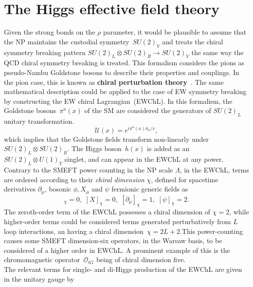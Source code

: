 \section{The Higgs effective field theory\label{sec:chiral}}
Given the strong bonds on the $\rho$ parameter, it would be plausible to assume that the NP maintains the custodial symmetry~$SU(2)_V$ and treats the chiral symmetry breaking pattern $SU(2)_L \otimes SU(2)_R \to SU(2)_V$  the same way the QCD chiral symmetry breaking is treated. This formalism considers the pions as pseudo-Nambu Goldstone bosons to describe their properties and couplings. In the pion case, this is known as \textbf{chiral perturbation theory}~\cite{GASSER1984142, GASSER1985465}. The same mathematical description could be applied to the case of EW symmetry breaking by constructing the EW chiral Lagrangian~(EWChL).   In this formalism, the Goldstone bosons~$\pi^a(x)$ of the SM are considered the generators of $SU(2)_L$ unitary transformation.
\begin{equation}
	\mathcal U(x) = e^{ i \pi^a(x)\sigma_a/v }, 
\end{equation}
which implies that the Goldstone fields transform non-linearly under~$SU(2)_L \otimes SU(2)_R$.  The Higgs boson~$h(x)$ is added as an $SU(2)_L \otimes U(1)_Y$ singlet, and can appear in the EWChL at any power. Contrary to the SMEFT power counting in the NP scale $ \Lambda$, in the EWChL, terms are ordered according to their \emph{chiral dimension} $\chi$, defined for spacetime derivatives $\partial_\mu$,  bosonic $\phi, X_\mu$ and $\psi$ fermionic generic fields as~\cite{Buchalla:2013rka,Buchalla:2015wfa}
\begin{equation}
	[\phi]_\chi =0,\,\, [X]_\chi =0,\,\, [\partial_\mu ]_\chi =1, \,\, [\psi]_\chi =2.
\end{equation}
The zeroth-order term of the EWChL possesses a chiral dimension of $\chi=2$, while higher-order terms could be considered terms generated perturbatively from $L$ loop interactions, an having a chiral dimension~$\chi= 2L+2$.This power-counting causes some SMEFT dimension-six operators, in the Warsaw basis, to be considered of a higher order in EWChL. A prominent example of this is the chromomagnetic operator~$\mathcal O_{tG}$ being of chiral dimension five. \\
The relevant terms for single- and di-Higgs production of the EWChL are given in the unitary gauge by~\cite{LHCHiggsCrossSectionWorkingGroup:2016ypw,DiVita:2017eyz}
